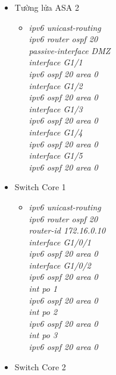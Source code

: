 \documentclass[12pt,a4paper]{report}
\begin{document}
\begin{itemize}
\begin{itemize}
\begin{itemize}
        \end{itemize}
        \item Tường lửa ASA 2
        \begin{itemize}
         \item \textit{ipv6 unicast-routing\\
ipv6 router ospf 20\\
passive-interface DMZ\\
interface G1/1\\
ipv6 ospf 20 area 0\\
interface G1/2\\
ipv6 ospf 20 area 0\\
interface G1/3\\
ipv6 ospf 20 area 0\\
interface G1/4\\
ipv6 ospf 20 area 0\\
interface G1/5\\
ipv6 ospf 20 area 0\\}
        
          \end{itemize}
            \item Switch Core 1
           
        \begin{itemize}
         \item \textit{ipv6 unicast-routing\\
ipv6 router ospf 20\\
router-id 172.16.0.10\\
interface G1/0/1\\
ipv6 ospf 20 area 0\\
interface G1/0/2\\
ipv6 ospf 20 area 0\\
int po 1\\
ipv6 ospf 20 area 0\\
int po 2\\
ipv6 ospf 20 area 0\\
int po 3\\
ipv6 ospf 20 area 0\\}
        
          \end{itemize}
             \item Switch Core 2
           

\end{itemize}
\end{itemize}
\end{document}
